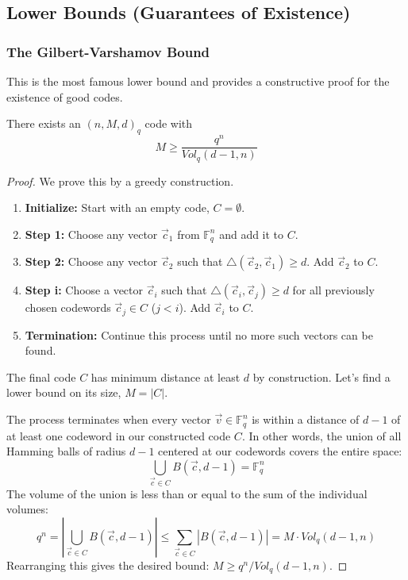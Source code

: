 \subsection{Lower Bounds (Guarantees of Existence)}

\subsubsection{The Gilbert-Varshamov Bound}

This is the most famous lower bound and provides a constructive proof for the existence of good codes.

\begin{theorem}
There exists an $(n, M, d)_q$ code with
\[ M \ge \frac{q^n}{Vol_q(d-1, n)} \]
\end{theorem}

\begin{proof}
We prove this by a greedy construction.
\begin{enumerate}
    \item \textbf{Initialize:} Start with an empty code, $C = \emptyset$.
    \item \textbf{Step 1:} Choose any vector $\vec{c}_1$ from $\mathbb{F}_q^n$ and add it to $C$.
    \item \textbf{Step 2:} Choose any vector $\vec{c}_2$ such that $\triangle(\vec{c}_2, \vec{c}_1) \ge d$. Add $\vec{c}_2$ to $C$.
    \item \textbf{Step i:} Choose a vector $\vec{c}_i$ such that $\triangle(\vec{c}_i, \vec{c}_j) \ge d$ for all previously chosen codewords $\vec{c}_j \in C$ ($j < i$). Add $\vec{c}_i$ to $C$.
    \item \textbf{Termination:} Continue this process until no more such vectors can be found.
\end{enumerate}
The final code $C$ has minimum distance at least $d$ by construction. Let's find a lower bound on its size, $M = |C|$.

The process terminates when every vector $\vec{v} \in \mathbb{F}_q^n$ is within a distance of $d-1$ of at least one codeword in our constructed code $C$. In other words, the union of all Hamming balls of radius $d-1$ centered at our codewords covers the entire space:
\[ \bigcup_{\vec{c} \in C} B(\vec{c}, d-1) = \mathbb{F}_q^n \]
The volume of the union is less than or equal to the sum of the individual volumes:
\[ q^n = \left| \bigcup_{\vec{c} \in C} B(\vec{c}, d-1) \right| \le \sum_{\vec{c} \in C} |B(\vec{c}, d-1)| = M \cdot Vol_q(d-1, n) \]
Rearranging this gives the desired bound: $M \ge q^n / Vol_q(d-1, n)$.
\end{proof}

